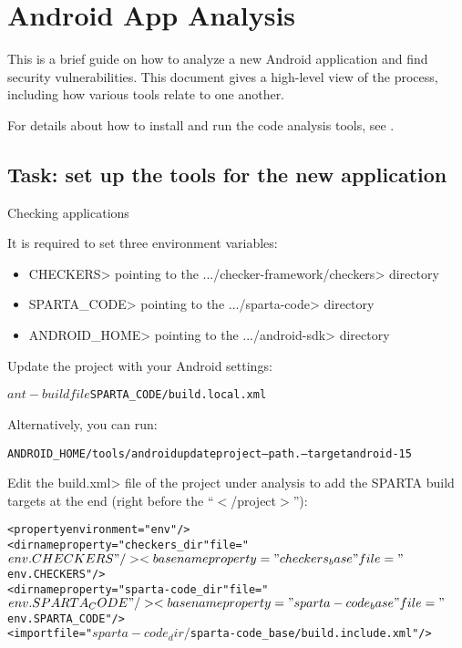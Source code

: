 \htmlhr
\chapter{Android App Analysis\label{appanalysis}}

This is a brief guide on how to analyze a new Android application and
find security vulnerabilities. This document gives a high-level view
of the process, including how various tools relate to one another.

For details about how to install and run the code analysis tools, see .


\section{Task:  set up the tools for the new application}

Checking applications

It is required to set three environment variables:

\begin{itemize}
\item
\<CHECKERS> pointing to the
\<.../checker-framework/checkers> directory

\item
\<SPARTA\_CODE> pointing to the \<.../sparta-code> directory

\item
\<ANDROID\_HOME> pointing to the \<.../android-sdk> directory

\end{itemize}


Update the project with your Android settings:

\begin{alltt}
$ ant -buildfile $SPARTA_CODE/build.local.xml
\end{alltt}

Alternatively, you can run:

\begin{alltt}
$ $ANDROID_HOME/tools/android update project --path . --target android-15
\end{alltt}

Edit the \<build.xml> file of the project under analysis to add the
SPARTA build targets at the end (right before the ``$<$/project$>$''):

\begin{alltt}
<property environment="env"/>
<dirname property="checkers_dir" file="${env.CHECKERS}"/>
<basename property="checkers_base" file="${env.CHECKERS}"/>
<dirname property="sparta-code_dir" file="${env.SPARTA_CODE}"/>
<basename property="sparta-code_base" file="${env.SPARTA_CODE}"/>
<import file="${sparta-code_dir}/${sparta-code_base}/build.include.xml"/>
\end{alltt}



